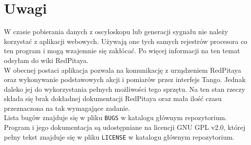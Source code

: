\documentclass[12pt,a4paper]{article}
\begin{document}
	\section{Uwagi}
	W czasie pobierania danych z oscyloskopu lub generacji sygnału nie należy korzystać z aplikacji webowych. Używają one tych samych rejestrów procesora co ten program i mogą wzajemnie się zakłócać. Po więcej informacji na ten temat odsyłam do wiki RedPitaya.\\
	W obecnej postaci aplikacja pozwala na komunikację z urządzeniem RedPitaya oraz wykonywanie podstawowych akcji i pomiarów przez interfejs Tango.
	Jednak daleko jej do wykorzystania pełnych możliwości tego sprzętu. Na ten stan rzeczy składa się brak dokładnej dokumentacji RedPitaya oraz mała ilość czasu przeznaczona na tak wymagające zadanie.\\
	Lista bugów znajduje się w pliku \texttt{BUGS} w katalogu głównym repozytorium.\\
	Program i jego dokumentacja są udostępniane na licencji GNU GPL v2.0, której pełny tekst znajduje się w pliku \texttt{LICENSE} w katalogu głównym repozytorium. 
\end{document}
